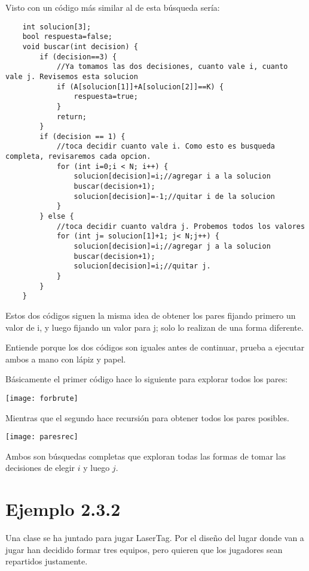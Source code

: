 Visto con un código más similar al de esta búsqueda sería:

\pagebreak

\begin{lstlisting}
	int solucion[3];
	bool respuesta=false;
	void buscar(int decision) {
		if (decision==3) {
			//Ya tomamos las dos decisiones, cuanto vale i, cuanto vale j. Revisemos esta solucion
			if (A[solucion[1]]+A[solucion[2]]==K) {
				respuesta=true;
			}
			return;
		}
		if (decision == 1) {
			//toca decidir cuanto vale i. Como esto es busqueda completa, revisaremos cada opcion.
			for (int i=0;i < N; i++) {
				solucion[decision]=i;//agregar i a la solucion
				buscar(decision+1);	
				solucion[decision]=-1;//quitar i de la solucion
			}
		} else {
			//toca decidir cuanto valdra j. Probemos todos los valores
			for (int j= solucion[1]+1; j< N;j++) {				
				solucion[decision]=i;//agregar j a la solucion
				buscar(decision+1);
				solucion[decision]=i;//quitar j.
			}
		}
	}
\end{lstlisting}

Estos dos códigos siguen la misma idea de obtener los pares fijando primero un valor de i, y  luego fijando un valor para j; solo lo realizan de una forma diferente.

Entiende porque los dos códigos son iguales antes de continuar, prueba a ejecutar ambos a mano con lápiz y papel.

Básicamente el primer código hace lo siguiente para explorar todos los pares:
\begin{center}
	\texttt{[image: forbrute]}
\end{center}

Mientras que el segundo hace recursión para obtener todos los pares posibles.

\begin{center}
	\texttt{[image: paresrec]}
\end{center}

Ambos son búsquedas completas que exploran todas las formas de tomar las decisiones de elegir \(i\) y luego \(j\).

\section*{Ejemplo 2.3.2}

Una clase se ha juntado para jugar LaserTag. Por el diseño del lugar donde van a jugar han decidido formar tres equipos, pero quieren que los jugadores sean repartidos justamente.

